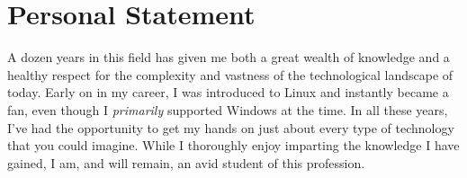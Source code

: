 \documentclass[]{twentysecondcv}
\begin{document}
\section{Personal Statement}
A dozen years in this field has given me both a great wealth of knowledge
and a healthy respect for the complexity and vastness of the technological
landscape of today. Early on in my career, I was introduced to Linux and instantly became a fan, even
though I \emph{primarily} supported Windows at the time. In all these years, I've had
the opportunity to get my hands on just about every type of technology that you could
imagine. While I thoroughly enjoy imparting the knowledge I have gained, I am, and
will remain, an avid student of this profession.

\end{document}
